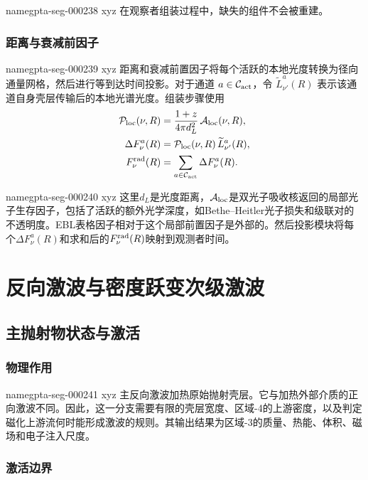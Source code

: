 \documentclass[twocolumn]{aastex702}
\makeatletter
\providecommand{\gptareaderanchor}[1]{\pdfdest name{#1} xyz}%
\providecommand{\gptareaderanchor}[1]{\special{pdf:dest (#1) [ @thispage /XYZ @xpos @ypos null ]}}%
\makeatother
\begin{document}
\gptareaderanchor{gpta-seg-000238}%
在观察者组装过程中，缺失的组件不会被重建。

\subsubsection{距离与衰减前因子}


\gptareaderanchor{gpta-seg-000239}%
距离和衰减前置因子将每个活跃的本地光度转换为径向通量网格，然后进行等到达时间投影。对于通道 \(a\in{\cal C}_{\rm act}\)，令 \(\widetilde L_{\nu'}^a(R)\) 表示该通道自身壳层传输后的本地光谱光度。组装步骤使用
\begin{equation}
\begin{aligned}
\mathcal{P}_{\rm loc}(\nu,R)&=
\frac{1+z}{4\pi d_L^2}\,
\mathcal{A}_{\rm loc}(\nu,R),\\
\Delta F_\nu^a(R)&=
\mathcal{P}_{\rm loc}(\nu,R)\,\widetilde L_{\nu'}^a(R),\\
F_\nu^{\rm rad}(R)&=
\sum_{a\in{\cal C}_{\rm act}}\Delta F_\nu^a(R).
\end{aligned}
\end{equation}

\gptareaderanchor{gpta-seg-000240}%
这里\(d_L\)是光度距离，\(\mathcal{A}_{\rm loc}\)是双光子吸收核返回的局部光子生存因子，包括了活跃的额外光学深度，如Bethe–Heitler光子损失和级联对的不透明度。EBL表格因子相对于这个局部前置因子是外部的。然后投影模块将每个\(\Delta F_\nu^a(R)\)和求和后的\(F_\nu^{\rm rad}(R)\)映射到观测者时间。

\section{反向激波与密度跃变次级激波} \label{sec:reverse-shock}

\subsection{主抛射物状态与激活}

\subsubsection{物理作用}


\gptareaderanchor{gpta-seg-000241}%
主反向激波加热原始抛射壳层。它与加热外部介质的正向激波不同。因此，这一分支需要有限的壳层宽度、区域-4的上游密度，以及判定磁化上游流何时能形成激波的规则。其输出结果为区域-3的质量、热能、体积、磁场和电子注入尺度。

\subsubsection{激活边界}
\end{document}
